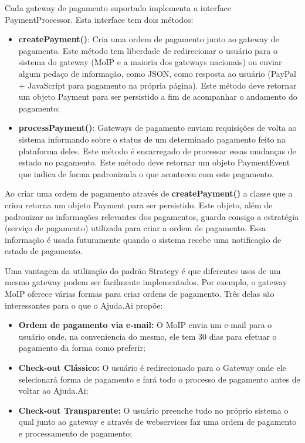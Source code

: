 Cada gateway de pagamento suportado implementa a interface PaymentProcessor. Esta interface tem dois métodos:

\begin{itemize}
  \item \textbf{createPayment()}: Cria uma ordem de pagamento junto ao gateway de pagamento. Este método tem liberdade de redirecionar o usuário para o sistema do gateway (MoIP e a maioria dos gateways nacionais) ou enviar algum pedaço de informação, como JSON, como resposta ao usuário (PayPal + JavaScript para pagamento na própria página). Este método deve retornar um objeto Payment para ser persistido a fim de acompanhar o andamento do pagamento;

  \item \textbf{processPayment()}: Gateways de pagamento enviam requisições de volta ao sistema informando sobre o status de um determinado pagamento feito na plataforma deles. Este método é encarregado de processar essas mudanças de estado no pagamento. Este método deve retornar um objeto PaymentEvent que indica de forma padronizada o que aconteceu com este pagamento.
\end{itemize}

Ao criar uma ordem de pagamento através de \textbf{createPayment()} a classe que a criou retorna um objeto Payment para ser persistido. Este objeto, além de padronizar as informações relevantes dos pagamentos, guarda consigo a estratégia (serviço de pagamento) utilizada para criar a ordem de pagamento. Essa informação é usada futuramente quando o sistema recebe uma notificação de estado de pagamento.

Uma vantagem da utilização do padrão Strategy é que diferentes usos de um mesmo gateway podem ser facilmente implementados. Por exemplo, o gateway MoIP oferece várias formas para criar ordens de pagamento. Três delas são interessantes para o que o Ajuda.Ai propõe:

\begin{itemize}
\item \textbf{Ordem de pagamento via e-mail:} O MoIP envia um e-mail para o usuário onde, na conveniencia do mesmo, ele tem 30 dias para efetuar o pagamento da forma como preferir;
\item \textbf{Check-out Clássico:} O usuário é redirecionado para o Gateway onde ele selecionará forma de pagamento e fará todo o processo de pagamento antes de voltar ao Ajuda.Ai;
\item \textbf{Check-out Transparente:} O usuário preenche tudo no próprio sistema o qual junto ao gateway e através de webservices faz uma ordem de pagamento e processamento de pagamento;
\end{itemize}

